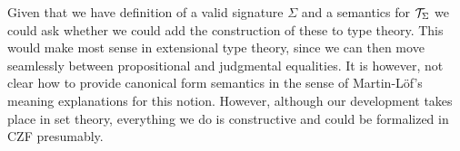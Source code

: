 \documentclass{lmcs}
\begin{document}
Given that we have definition of a valid signature $\Sigma$ and a semantics for ${\mathcal T}_\Sigma$ we could ask whether we could add the construction of these to type theory. This would make most sense in extensional type theory, since we can then move seamlessly between propositional and judgmental equalities. It is however, not clear how to provide canonical form semantics in the sense of Martin-Löf's meaning explanations for this notion. However, although our development takes place in set theory, everything we do is constructive and could be formalized in CZF presumably.



%
\end{document}
